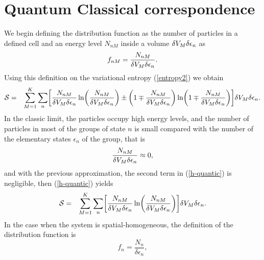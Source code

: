 
\section{Quantum Classical correspondence}\label{sec:qccorrespondence}
We begin defining the distribution function as the number of particles in a defined cell and an energy level $N_{nM}$ inside a volume $\delta V_M \delta \epsilon_n$ as
\begin{equation}
    f_{nM}=\frac{N_{nM}}{ \delta V_M \delta \epsilon_{n} }.
\end{equation}
Using this definition on the variational entropy (\ref{entropy2}) we obtain
\begin{eqnarray}
    \Ss&=& \sum_{M=1}^{K} \sum_n
    \left[  
           \frac{N_{nM}}{ \de V_M\delta \epsilon_{n}} \ln 
           \left( 
                  \frac{N_{nM}}{ \de V_M\delta \epsilon_{n}}
           \right)\pm 
           \left(  
                  1\mp \frac{N_{nM}}{ \de V_M \delta \epsilon_{n}}
           \right) \ln 
           \left(  
                   1\mp \frac{N_{nM}}{ \de V_M \delta \epsilon_{n}}
           \right)
    \right] \de V_M \delta \epsilon_{n}. \nonumber \\
    \label{h-quantic} 
\end{eqnarray}
In the classic limit, the particles occupy high energy levels, and the number of particles in most of the groups of state $n$ is small compared with the number of the elementary states $\epsilon_n$ of the group, that is
\begin{equation}
    \frac{N_{nM}}{ \delta V_M \delta \epsilon_{n} } \approx 0,
\end{equation}
and with the previous approximation, the second term in (\ref{h-quantic}) is negligible, then (\ref{h-quantic}) yields
\begin{eqnarray}
    \Ss&=& \sum_{M=1}^{K} \sum_n
    \left[  
           \frac{N_{nM}}{ \de V_M \delta \epsilon_{n}} \ln 
           \left( 
                  \frac{N_{nM}}{ \de V_M \delta \epsilon_{n}}
           \right)
    \right] \de V_M \delta \epsilon_{n}. \label{h-quantic2}
\end{eqnarray}
In the case when the system is spatial-homogeneous, the definition of the distribution function is 
\begin{equation}
    f_{n}=\frac{N_{n}}{ \delta \epsilon_{n} },
\end{equation}

